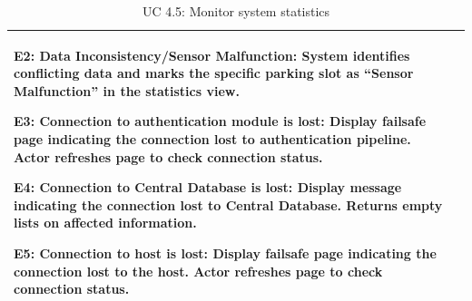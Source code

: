 \begin{table}[H]
\begin{tabularx}{\textwidth}{|>{\raggedright\arraybackslash}p{3.5cm}|>{\RaggedRight\arraybackslash}X|}
\textbf{E2: Data Inconsistency/Sensor Malfunction:} System identifies conflicting data and marks the specific parking slot as ``Sensor Malfunction'' in the statistics view. \par \vspace{0.5em}
\textbf{E3: Connection to authentication module is lost:} Display failsafe page indicating the connection lost to authentication pipeline. Actor refreshes page to check connection status. \par \vspace{0.5em}
\textbf{E4: Connection to Central Database is lost:} Display message indicating the connection lost to Central Database. Returns empty lists on affected information. \par \vspace{0.5em}
\textbf{E5: Connection to host is lost:} Display failsafe page indicating the connection lost to the host. Actor refreshes page to check connection status. \\
\hline
\end{tabularx}
\caption{UC 4.5: Monitor system statistics}
\label{tab:uc4.5}
\end{table}